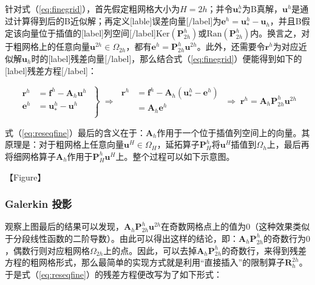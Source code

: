 \documentclass[12pt, UTF8, nofonts]{ctexart}
\begin{document}
针对式（\ref{eq:finegrid}），首先假定粗网格大小为$H=2h$；并令$\boldsymbol{u}^h_{\ast}$为B真解，$\boldsymbol{u}^h$是通过计算得到后的B近似解；再定义[lable]误差向量[/label]为$\boldsymbol{e}^h = \boldsymbol{u}^h_{\ast}-\boldsymbol{u}_h$，并且B假定该向量位于插值的[label]列空间[/label]$\mathrm{Ker}(\boldsymbol{P}_{2h}^{h})$或$\mathrm{Ran}(\boldsymbol{P}_{2h}^h)$内。换言之，对于粗网格上的任意向量$\boldsymbol{u}^{2h}\in\Omega_{2h}$，都有$\boldsymbol{e}^h=\boldsymbol{P}_{2h}^{h}\boldsymbol{u}^{2h}$。此外，还需要令$\boldsymbol{r}^h$为对应近似解$\boldsymbol{u}_h$时的[label]残差向量[/label]，那么结合式（\ref{eq:finegrid}）便能得到如下的[label]残差方程[/label]：

\begin{equation}
  \label{eq:reseqfine}
  \left.\begin{aligned}
    \boldsymbol{r}^h &= \boldsymbol{f}^h - \boldsymbol{A}_h\boldsymbol{u}^h \\
    \boldsymbol{e}^h &= \boldsymbol{u}^h_{\ast} - \boldsymbol{u}^h \\
  \end{aligned}\;\right\} \;\Rightarrow\;
  \begin{aligned}
    \boldsymbol{r}^h &= \boldsymbol{f}^h - \boldsymbol{A}_h(\boldsymbol{u}_\ast^h-\boldsymbol{e}^h) \\
    &= \boldsymbol{A}_h\boldsymbol{e}^h \\
  \end{aligned} \;\Rightarrow\;
  \boldsymbol{r}^h = \boldsymbol{A}_h\boldsymbol{P}_{2h}^{h}\boldsymbol{u}^{2h}
\end{equation}

式（\ref{eq:reseqfine}）最后的含义在于：$\boldsymbol{A}_h$作用于一个位于插值列空间上的向量。其原理是：对于粗网格上任意向量$\boldsymbol{u}^{H}\in\Omega_H$，延拓算子$\boldsymbol{P}_{H}^{h}$将$\boldsymbol{u}^{H}$插值到$\Omega_h$上，最后再将细网格算子$\boldsymbol{A}_h$作用于$\boldsymbol{P}_{H}^h\boldsymbol{u}^{H}$上。整个过程可以如下示意图。

【Figure】

\subsubsection*{Galerkin 投影}

观察上图最后的结果可以发现，$\boldsymbol{A}_h\boldsymbol{P}_{2h}^{h}\boldsymbol{u}^{2h}$在奇数网格点上的值为$0$（这种效果类似于分段线性函数的二阶导数）。由此可以得出这样的结论，即：$\boldsymbol{A}_h\boldsymbol{P}_{2h}^{h}$的奇数行为$0$，偶数行则对应粗网格$\Omega_{2h}$上的点。因此，可以去掉$\boldsymbol{A}_h\boldsymbol{P}_{2h}^{h}$的奇数行，来得到残差方程的粗网格形式，那么最简单的实现方式就是利用“直接插入”的限制算子$\boldsymbol{R}_{h}^{2h}$。于是式（\ref{eq:reseqfine}）的残差方程便改写为了如下形式：
\end{document}
